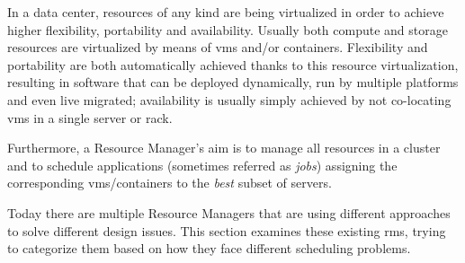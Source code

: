 In a data center, resources of any kind are being virtualized in order to achieve higher flexibility, portability and availability.
Usually both compute and storage resources are virtualized by means of \glspl{vm} and/or containers.
Flexibility and portability are both automatically achieved thanks to this resource virtualization, resulting in software that can be deployed dynamically, run by multiple platforms and even live migrated; availability is usually simply achieved by not co-locating \glspl{vm} in a single server or rack.

Furthermore, a Resource Manager's aim is to manage all resources in a cluster and to schedule applications (sometimes referred as \textit{jobs}) assigning the corresponding \glspl{vm}/containers to the \textit{best} subset of servers.

Today there are multiple Resource Managers that are using different approaches to solve different design issues.
This section examines these existing \glspl{rm}, trying to categorize them based on how they face different scheduling problems.